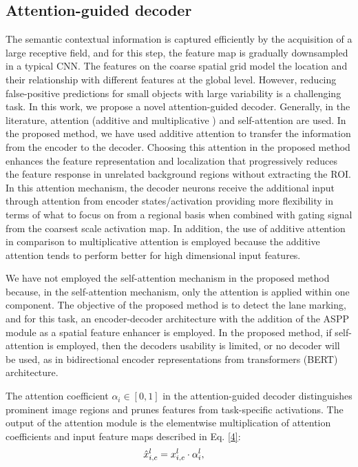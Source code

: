 \documentclass[journal]{IEEEtran}
\begin{document}
\subsection{Attention-guided decoder}
The semantic contextual information is captured efficiently by the acquisition of a large receptive field, and for this step, the feature map is gradually downsampled in a typical CNN. The features on the coarse spatial grid model the location and their relationship with different features at the global level. However, reducing false-positive predictions for small objects with large variability is a challenging task. In this work, we propose a novel attention-guided decoder. 
Generally, in the literature, attention (additive \cite{bahdanau2014neural} and multiplicative \cite{luong2015effective}) and self-attention are used. In the proposed method, we have used additive attention \cite{bahdanau2014neural} to transfer the information from the encoder to the decoder. Choosing this attention in the proposed method enhances the feature representation and localization that progressively reduces the feature response in unrelated background regions without extracting the ROI. In this attention mechanism, the decoder neurons receive the additional input through attention from encoder states/activation providing more flexibility in terms of what to focus on from a regional basis when combined with gating signal from the coarsest scale activation map. In addition, the use of additive attention in comparison to multiplicative attention is employed because the additive attention tends to perform better for high dimensional input features.
\par
We have not employed the self-attention mechanism in the proposed method because, in the self-attention mechanism, only the attention is applied within one component. The objective of the proposed method is to detect the lane marking, and for this task, an encoder-decoder architecture with the addition of the ASPP module as a spatial feature enhancer is employed. In the proposed method, if self-attention is employed, then the decoders usability is limited, or no decoder will be used, as in bidirectional encoder representations from transformers (BERT) \cite{devlin2018bert} architecture.
\par
The attention coefficient $\alpha_i \in[0,1]$ in the attention-guided decoder distinguishes prominent image regions and prunes features from task-specific activations. The output of the attention module is the elementwise multiplication of attention coefficients and input feature maps described in Eq. \ref{4}:
\begin{equation}
\vspace{0.1cm}
\begin{aligned}
 & \hat{x}^l_{i,c}=x^l_{i,c}\cdot \alpha^l_i,
 \label{4} 
\end{aligned}
\end{equation}
\end{document}
